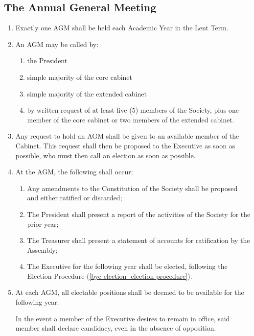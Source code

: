 \documentclass[parskip=half]{scrartcl}
\begin{document}
        \subsection{The Annual General Meeting}
            \label{gm--agm}
            \begin{enumerate}
                \item Exactly one AGM shall be held each Academic Year in the Lent Term.
                \item An AGM may be called by:
                    \begin{enumerate}
                        \item the President
                        \item simple majority of the core cabinet
                        \item simple majority of the extended cabinet
                        \item by written request of at least five (5) members of the Society, plus one member of the core cabinet or two members of the extended cabinet.
                    \end{enumerate}
                \item Any request to hold an AGM shall be given to an available member of the Cabinet. This request shall then be proposed to the Executive as soon as possible, who must then call an election as soon as possible.
                \item At the AGM, the following shall occur:
                    \begin{enumerate}
                        \item Any amendments to the Constitution of the Society shall be proposed and either ratified or discarded;
                        \item The President shall present a report of the activities of the Society for the prior year;
                        \item The Treasurer shall present a statement of accounts for ratification by the Assembly;
                        \item The Executive for the following year shall be elected, following the Election Procedure (\ref{bye-election--election-procedure}).

                    \end{enumerate}
                                        
                    \item At each AGM, all electable positions shall be deemed to be available for the following year. 

                        \subitem In the event a member of the Executive desires to remain in office, said member shall declare candidacy, even in the absence of opposition.
            \end{enumerate}
        
\end{document}
